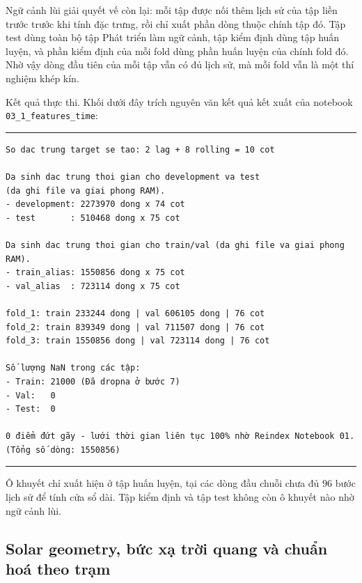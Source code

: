 \documentclass[12pt, a4paper]{report}
\begin{document}
Ngữ cảnh lùi giải quyết vế còn lại: mỗi tập được nối thêm lịch sử của tập liền trước
trước khi tính đặc trưng, rồi chỉ xuất phần dòng thuộc chính tập đó. Tập test dùng toàn
bộ tập Phát triển làm ngữ cảnh, tập kiểm định dùng tập huấn luyện, và phần kiểm định của
mỗi fold dùng phần huấn luyện của chính fold đó. Nhờ vậy dòng đầu tiên của mỗi tập vẫn có
đủ lịch sử, mà mỗi fold vẫn là một thí nghiệm khép kín.

Kết quả thực thi. Khối dưới đây trích nguyên văn kết quả kết xuất của notebook
\texttt{03\_1\_features\_time}:

\begingroup
\par\vspace{6pt}\hrule\vspace{4pt}
\footnotesize\renewcommand{\baselinestretch}{1.0}\selectfont
\begin{verbatim}
So dac trung target se tao: 2 lag + 8 rolling = 10 cot

Da sinh dac trung thoi gian cho development va test
(da ghi file va giai phong RAM).
- development: 2273970 dong x 74 cot
- test       : 510468 dong x 75 cot

Da sinh dac trung thoi gian cho train/val (da ghi file va giai phong RAM).
- train_alias: 1550856 dong x 75 cot
- val_alias  : 723114 dong x 75 cot

fold_1: train 233244 dong | val 606105 dong | 76 cot
fold_2: train 839349 dong | val 711507 dong | 76 cot
fold_3: train 1550856 dong | val 723114 dong | 76 cot

Số lượng NaN trong các tập:
- Train: 21000 (Đã dropna ở bước 7)
- Val:   0
- Test:  0

0 điểm đứt gãy - lưới thời gian liên tục 100% nhờ Reindex Notebook 01.
(Tổng số dòng: 1550856)
\end{verbatim}
\vspace{2pt}\hrule\par\vspace{6pt}
\endgroup

Ô khuyết chỉ xuất hiện ở tập huấn luyện, tại các dòng đầu chuỗi chưa đủ $96$ bước lịch sử
để tính cửa sổ dài. Tập kiểm định và tập test không còn ô khuyết nào nhờ ngữ cảnh lùi.

\FloatBarrier
\subsection{Solar geometry, bức xạ trời quang và chuẩn hoá theo trạm}
\label{subsec:solar_geometry}
\end{document}
